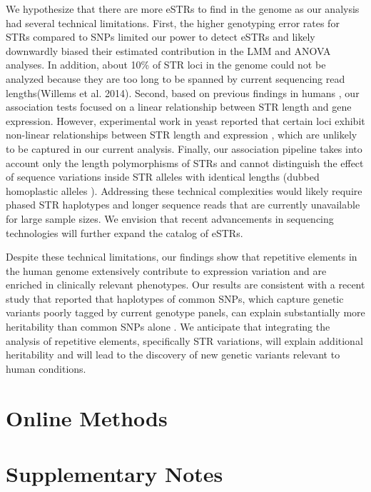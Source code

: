 We hypothesize that there are more eSTRs to find in the genome as our analysis had several technical limitations. First, the higher genotyping error rates for STRs compared to SNPs limited our power to detect eSTRs and likely downwardly biased their estimated contribution in the LMM and ANOVA analyses. In addition, about 10\% of STR loci in the genome could not be analyzed because they are too long to be spanned by current sequencing read lengths(Willems et al. 2014). Second, based on previous findings in humans \cite{GebhardtZankerBrandt1999,ShimajiriArimaTanimotoEtAl1999,ContenteDittmerKochEtAl2002}, our association tests focused on a linear relationship between STR length and gene expression. However, experimental work in yeast reported that certain loci exhibit non-linear relationships between STR length and expression \cite{VincesLegendreCaldaraEtAl2009}, which are unlikely to be captured in our current analysis. Finally, our association pipeline takes into account only the length polymorphisms of STRs and cannot distinguish the effect of sequence variations inside STR alleles with identical lengths (dubbed homoplastic alleles \cite{WeberBroman2001}). Addressing these technical complexities would likely require phased STR haplotypes and longer sequence reads that are currently unavailable for large sample sizes. We envision that recent advancements in sequencing technologies \cite{ChaissonHuddlestonDennisEtAl2015} will further expand the catalog of eSTRs.  

Despite these technical limitations, our findings show that repetitive elements in the human genome extensively contribute to expression variation and are enriched in clinically relevant phenotypes. Our results are consistent with a recent study that reported that haplotypes of common SNPs, which capture genetic variants poorly tagged by current genotype panels, can explain substantially more heritability than common SNPs alone \cite{BhatiaGusevLohEtAl2015}. We anticipate that integrating the analysis of repetitive elements, specifically STR variations, will explain additional heritability and will lead to the discovery of new genetic variants relevant to human conditions.

\section{Online Methods}
\label{sec:estrolm}

\section{Supplementary Notes}
\label{sec:estrsupnote}

